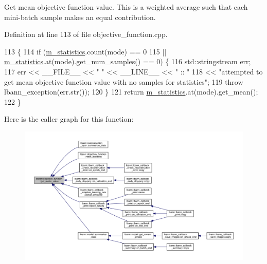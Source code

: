 Get mean objective function value. This is a weighted average such that each mini-\/batch sample makes an equal contribution. 

Definition at line 113 of file objective\+\_\+function.\+cpp.


\begin{DoxyCode}
113                                                                      \{
114   \textcolor{keywordflow}{if} (\hyperlink{classlbann_1_1objective__function_ad5daa18c52374a849c6fbd515bcc1eb1}{m\_statistics}.count(mode) == 0
115       || \hyperlink{classlbann_1_1objective__function_ad5daa18c52374a849c6fbd515bcc1eb1}{m\_statistics}.at(mode).get\_num\_samples() == 0) \{
116     std::stringstream err;
117     err << \_\_FILE\_\_ << \textcolor{stringliteral}{" "} << \_\_LINE\_\_ << \textcolor{stringliteral}{" :: "}
118         << \textcolor{stringliteral}{"attempted to get mean objective function value with no samples for statistics"};
119     \textcolor{keywordflow}{throw} lbann\_exception(err.str());
120   \}
121   \textcolor{keywordflow}{return} \hyperlink{classlbann_1_1objective__function_ad5daa18c52374a849c6fbd515bcc1eb1}{m\_statistics}.at(mode).get\_mean();
122 \}
\end{DoxyCode}
Here is the caller graph for this function\+:\nopagebreak
\begin{figure}[H]
\begin{center}
\leavevmode
\includegraphics[width=350pt]{classlbann_1_1objective__function_a0aa271e497363e97ba3741292961d47d_icgraph}
\end{center}
\end{figure}
\mbox{\label{classlbann_1_1objective__function_a19078ce481d321627adfe0151112602e}} 
